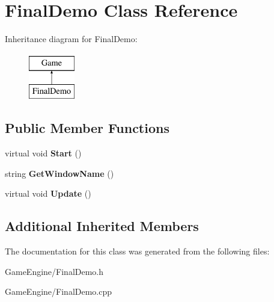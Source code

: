 \section{Final\+Demo Class Reference}
\label{class_final_demo}
Inheritance diagram for Final\+Demo\+:\begin{figure}[H]
\begin{center}
\leavevmode
\includegraphics[height=2.000000cm]{class_final_demo}
\end{center}
\end{figure}
\subsection*{Public Member Functions}
\begin{DoxyCompactItemize}
\item 
\mbox{\label{class_final_demo_acfe20f78ee43e82c60112f6ffada0be6}} 
virtual void {\bfseries Start} ()
\item 
\mbox{\label{class_final_demo_a98a9ba399b62e74fea84a2ccdc680e42}} 
string {\bfseries Get\+Window\+Name} ()
\item 
\mbox{\label{class_final_demo_a4d5c41d8509ba3126c106cfb95d6a1b1}} 
virtual void {\bfseries Update} ()
\end{DoxyCompactItemize}
\subsection*{Additional Inherited Members}


The documentation for this class was generated from the following files\+:\begin{DoxyCompactItemize}
\item 
Game\+Engine/Final\+Demo.\+h\item 
Game\+Engine/Final\+Demo.\+cpp\end{DoxyCompactItemize}
